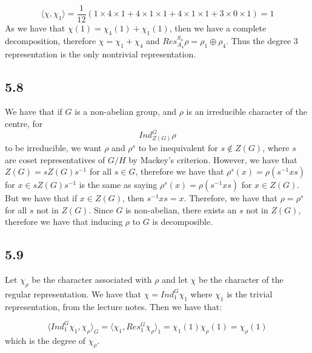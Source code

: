 \documentclass[]{article}
\begin{document}
\begin{equation}
	\langle \chi, \chi_1 \rangle = \frac{1}{12} \left(1 \times 4 \times 1 + 4 \times 1 \times 1 + 4 \times 1 \times 1 + 3 \times 0 \times 1\right) = 1
\end{equation}
As we have that $\chi(1) = \chi_4(1) + \chi_1(1)$, then we have a complete decomposition, therefore $\chi = \chi_1 + \chi_4$ and $Res^{S_4}_{A_4} \rho = \rho_1 \oplus \rho_4$. Thus the degree 3 representation is the only nontrivial representation. 

\subsection*{5.8}
We have that if $G$ is a non-abelian group, and $\rho$ is an irreducible character of the centre, for
\begin{equation}
	Ind_{Z(G)}^G \rho
\end{equation}
to be irreducible, we want $\rho$ and $\rho^s$ to be inequivalent for $s \notin Z(G)$, where $s$ are coset representatives of $G / H$ by Mackey's criterion. However, we have that $Z(G) = s Z(G) s^{-1}$ for all $s \in G$, therefore we have that $\rho^s(x) = \rho(s^{-1} x s)$ for $x \in s Z(G) s^{-1}$ is the same as saying 
$\rho^s(x) = \rho(s^{-1} x s)$ for $x \in Z(G)$. But we have that if $x \in Z(G)$, then $s^{-1} x s = x$. Therefore, we have that $\rho = \rho^s$ for all $s$ not in $Z(G)$. Since $G$ is non-abelian, there exists an $s$ not in $Z(G)$, therefore we have that inducing $\rho$ to $G$ is decomposible. 
\subsection*{5.9}
Let $\chi_\rho$ be the character associated with $\rho$ and let $\chi$ be the character of the regular representation. We have that $\chi = Ind_{1}^G \chi_1$ where $\chi_1$ is the trivial representation, from the lecture notes. Then we have that:

\begin{equation}
	\langle Ind_{1}^G \chi_1, \chi_\rho \rangle_{G} = \langle \chi_1, Res_{1}^G \chi_{\rho} \rangle_1 = \chi_1(1)\chi_\rho(1) = \chi_\rho(1)
\end{equation}
which is the degree of $\chi_\rho$. 
\end{document}
